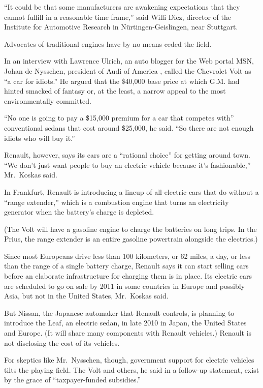 ﻿\documentclass[12pt]{article}
\begin{document}
``It could be that some manufacturers are awakening expectations that they cannot fulfill in a
reasonable time frame,'' said Willi Diez, director of the Institute for Automotive Research in
Nürtingen-Geislingen, near Stuttgart.

Advocates of traditional engines have by no means ceded\cite{cede} the field.

In an interview with Lawrence Ulrich, an auto blogger for the Web portal MSN, Johan de Nysschen,
president of Audi of America , called the Chevrolet Volt as ``a car for idiots.'' He argued that the
\$40,000 base price at which G.M. had hinted smacked of fantasy or, at the least, a narrow appeal to
the most environmentally committed.

``No one is going to pay a \$15,000 premium for a car that competes with'' conventional sedans that
cost around \$25,000, he said. ``So there are not enough idiots who will buy it.''

Renault, however, says its cars are a ``rational choice'' for getting around town. ``We don't just
want people to buy an electric vehicle because it's fashionable,'' Mr.~Koskas said.

In Frankfurt, Renault is introducing a lineup of all-electric cars that do without a ``range
extender,'' which is a combustion engine that turns an electricity generator when the battery's
charge is depleted.

(The Volt will have a gasoline engine to charge the batteries on long trips. In the Prius, the range
extender is an entire gasoline powertrain alongside the electrics.)

Since most Europeans drive less than 100 kilometers, or 62 miles, a day, or less than the range of a
single battery charge, Renault says it can start selling cars before an elaborate infrastructure for
charging them is in place. Its electric cars are scheduled to go on sale by 2011 in some countries
in Europe and possibly Asia, but not in the United States, Mr.~Koskas said.

But Nissan, the Japanese automaker that Renault controls, is planning to introduce the Leaf, an
electric sedan, in late 2010 in Japan, the United States and Europe. (It will share many components
with Renault vehicles.) Renault is not disclosing the cost of its vehicles.

For skeptics like Mr.~Nysschen, though, government support for electric vehicles tilts the playing
field. The Volt and others, he said in a follow-up statement, exist by the grace of
``taxpayer-funded subsidies.''
\end{document}
